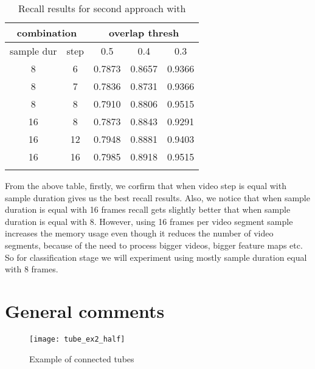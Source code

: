 \begin{center}
\begin{longtable}{||c c||c c c||}

  \hline
  \multicolumn{2}{||c||}{\textbf{combination}} &\multicolumn{3}{|c||}{\textbf{overlap thresh}}\\
  \hline
  sample dur & step &  0.5  &  0.4 &  0.3 \\
  \hline   \hline

  8 & 6 & 0.7873 & 0.8657 & 0.9366  \\
  \hline
  8 & 7 & 0.7836 & 0.8731 & 0.9366  \\
  \hline
  8 &  8 & 0.7910 & 0.8806 & 0.9515 \\
  \hline 

  16 & 8  & 0.7873 & 0.8843 & 0.9291 \\
  \hline
  16 & 12 & 0.7948 & 0.8881 & 0.9403 \\
  \hline
  16 & 16 & 0.7985 & 0.8918 & 0.9515 \\
  \hline \hline
  \caption{Recall results for second approach with  }
  \label{table:conn_app3}
\end{longtable} 
\end{center}

From the above table, firstly, we corfirm that when video step is equal with sample duration gives us the best recall results.
Also, we notice that when sample duration is equal with 16  frames recall gets slightly better that when sample duration is
equal with 8. However, using  16 frames per video segment sample increases the memory usage even though it reduces the number of video segments, because of the
need to process bigger videos, bigger feature maps etc. So for classification stage we will experiment using mostly sample duration equal
with 8 frames.

\section {General comments}

\begin{figure}[h]
  \centering
  \texttt{[image: tube\_ex2\_half]}
  \caption{Example of connected tubes}
  \label{fig:tube_ex}
\end{figure}

